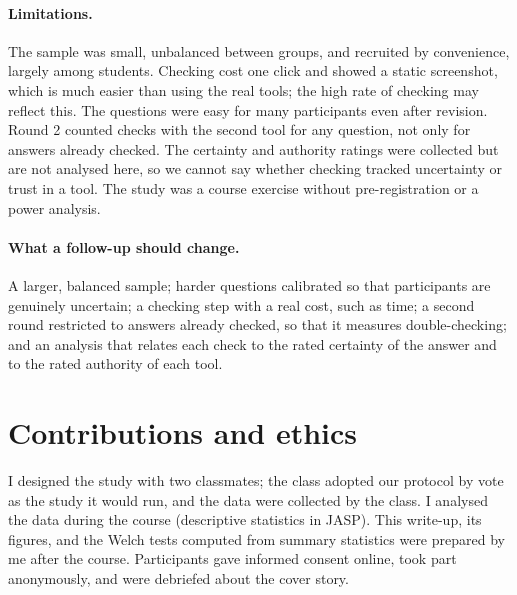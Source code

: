 \documentclass[11pt,a4paper]{article}
\begin{document}
\paragraph{Limitations.} The sample was small, unbalanced between groups, and recruited by convenience, largely among students. Checking cost one click and showed a static screenshot, which is much easier than using the real tools; the high rate of checking may reflect this. The questions were easy for many participants even after revision. Round 2 counted checks with the second tool for any question, not only for answers already checked. The certainty and authority ratings were collected but are not analysed here, so we cannot say whether checking tracked uncertainty or trust in a tool. The study was a course exercise without pre-registration or a power analysis.

\paragraph{What a follow-up should change.} A larger, balanced sample; harder questions calibrated so that participants are genuinely uncertain; a checking step with a real cost, such as time; a second round restricted to answers already checked, so that it measures double-checking; and an analysis that relates each check to the rated certainty of the answer and to the rated authority of each tool.

\section*{Contributions and ethics}
I designed the study with two classmates; the class adopted our protocol by vote as the study it would run, and the data were collected by the class. I analysed the data during the course (descriptive statistics in JASP). This write-up, its figures, and the Welch tests computed from summary statistics were prepared by me after the course. Participants gave informed consent online, took part anonymously, and were debriefed about the cover story.
\end{document}
